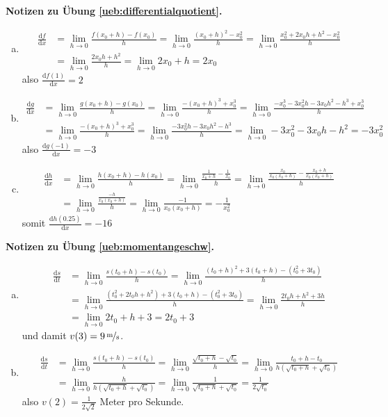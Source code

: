 \documentclass[%
11pt,%
twoside,%
titlepage,%
german,%
headsepline%
]{scrartcl}
\theoremstyle{definition}
\theoremstyle{plain}
\newcommand{\concatueb}[1]{ueb:#1}%
\newcommand{\concatlsg}[1]{lsg:#1}%
\newenvironment{lsg}[1]{%
    \par\noindent\textbf{Notizen zu Übung \ref{\concatueb{#1}}.}%
    \label{\concatlsg{#1}}
}{%
    \par%
}
\begin{document}
\begin{lsg}{differentialquotient}
    \begin{enumerate}[a)]
        \item
        \begin{align*}
        		\frac{\mathrm{d}f}{\mathrm{d}x} &= \lim_{h\to0}\frac{f(x_0+h)-f(x_0)}{h}=\lim_{h\to0}\frac{(x_0+h)^2-x_0^2}{h}=\lim_{h\to0}\frac{x_0^2+2x_0h+h^2-x_0^2}{h}\\
		&= \lim_{h\to0}\frac{2x_0h+h^2}{h}=\lim_{h\to0}2x_0+h=2x_0
	\end{align*}
	also $\frac{\mathrm{d}f(1)}{\mathrm{d}x}=2$
	
        \item
        \begin{align*}
        		\frac{\mathrm{d}g}{\mathrm{d}x} &= \lim_{h\to0}\frac{g(x_0+h)-g(x_0)}{h}=\lim_{h\to0}\frac{-(x_0+h)^3+x_0^3}{h}=\lim_{h\to0}\frac{-x_0^3-3x_0^2h-3x_0h^2-h^3+x_0^3}{h}\\
		&= \lim_{h\to0}\frac{-(x_0+h)^3+x_0^3}{h}=\lim_{h\to0}\frac{-3x_0^2h-3x_0h^2-h^3}{h}=\lim_{h\to0}-3x_0^2-3x_0h-h^2=-3x_0^2
        \end{align*}
	also $\frac{\mathrm{d}g(-1)}{\mathrm{d}x}=-3$
        \item
        \begin{align*}
        		\frac{\mathrm{d}h}{\mathrm{d}x} &= \lim_{h\to0}\frac{h(x_0+h)-h(x_0)}{h}=\lim_{h\to0}\frac{\frac{1}{x_0+h}-\frac{1}{x_0}}{h}=\lim_{h\to0}\frac{\frac{x_0}{x_0(x_0+h)}-\frac{x_0+h}{x_0(x_0+h)}}{h}\\
		&= \lim_{h\to0}\frac{\frac{-h}{x_0(x_0+h)}}{h}=\lim_{h\to0}\frac{-1}{x_0(x_0+h)}=-\frac{1}{x_0^2}
        \end{align*}
	somit $\frac{\mathrm{d}h(0.25)}{\mathrm{d}x}=-16$ 
    \end{enumerate}
\end{lsg}
\begin{lsg}{momentangeschw}
    \begin{enumerate}[a)]
        \item
        \begin{align*}
        		\frac{\mathrm{d}s}{\mathrm{d}t} &= \lim_{h\to0}\frac{s(t_0+h)-s(t_0)}{h}=\lim_{h\to0}\frac{(t_0+h)^2+3(t_0+h)-(t_0^2+3t_0)}{h}\\
		&= \lim_{h\to0}\frac{(t_0^2+2t_0h+h^2)+3(t_0+h)-(t_0^2+3t_0)}{h}=\lim_{h\to0}\frac{2t_0h+h^2+3h}{h}\\
		&= \lim_{h\to0}2t_0+h+3=2t_0+3
        \end{align*}
	und damit $v(3)=\unitfrac[9]{m}{s}$.
        \item
        \begin{align*}
        		\frac{\mathrm{d}s}{\mathrm{d}t} &= \lim_{h\to0}\frac{s(t_0+h)-s(t_0)}{h}=\lim_{h\to0}\frac{\sqrt{t_0+h}-\sqrt{t_0}}{h}=\lim_{h\to0}\frac{t_0+h-t_0}{h(\sqrt{t_0+h}+\sqrt{t_0})}\\
		&= \lim_{h\to0}\frac{h}{h(\sqrt{t_0+h}+\sqrt{t_0})}=\lim_{h\to0}\frac{1}{\sqrt{t_0+h}+\sqrt{t_0}}=\frac{1}{2\sqrt{t_0}}
        \end{align*}
	also $v(2)=\frac{1}{2\sqrt{2}}$ Meter pro Sekunde.
    \end{enumerate}
\end{lsg}
\end{document}
